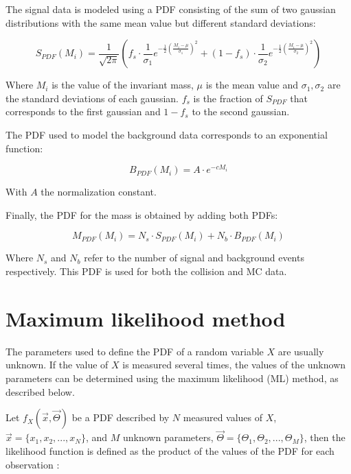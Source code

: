 The signal data is modeled using a PDF consisting of the sum of two gaussian distributions with the same mean value but different standard deviations:

\begin{equation}
S_{PDF}(M_i) = \frac{1}{\sqrt{2\pi}} \left(f_s \cdot \frac{1}{\sigma_1}e^{-\frac{1}{2}\left(\frac{M_i-\mu}{\sigma_1}\right)^2} + (1 - f_s) \cdot \frac{1}{\sigma_2}e^{-\frac{1}{2}\left(\frac{M_i-\mu}{\sigma_2}\right)^2}\right)
\end{equation}

Where $M_i$ is the value of the invariant mass, $\mu$ is the mean value and $\sigma_1, \sigma_2$ are the standard deviations of each gaussian. $f_s$ is the fraction of $S_{PDF}$ that corresponds to the first gaussian and $1-f_s$ to the second gaussian. 

The PDF used to model the background data corresponds to an exponential function:

\begin{equation}
B_{PDF}(M_i) = A \cdot e^{-cM_i}
\end{equation}

With $A$ the normalization constant. 

Finally, the PDF for the mass is obtained by adding both PDFs:

\begin{equation}
M_{PDF}(M_i) = N_s \cdot S_{PDF}(M_i)  + N_b \cdot B_{PDF}(M_i)
\label{eq:masspdf}
\end{equation}

Where $N_s$ and $N_b$ refer to the number of signal and background events respectively. This PDF is used for both the collision and MC data.

\section{Maximum likelihood method}
\label{mlmethod}
The parameters used to define the PDF of a random variable $X$ are usually unknown. If the value of $X$ is measured several times, the values of the unknown parameters can be determined using the maximum likelihood (ML) method, as described below.

Let $f_X(\vec{x}, \vec{\Theta} )$ be a PDF described by $N$ measured values of $X$, $\vec{x} = \{x_1, x_2, ..., x_N\}$, and $M$ unknown parameters, $\vec{\Theta} = \{\Theta_1, \Theta_2, ..., \Theta_M \}$, then the likelihood function is defined as the product of the values of the PDF for each observation \cite{bonanomi2021response,vsirca2016probability}:

